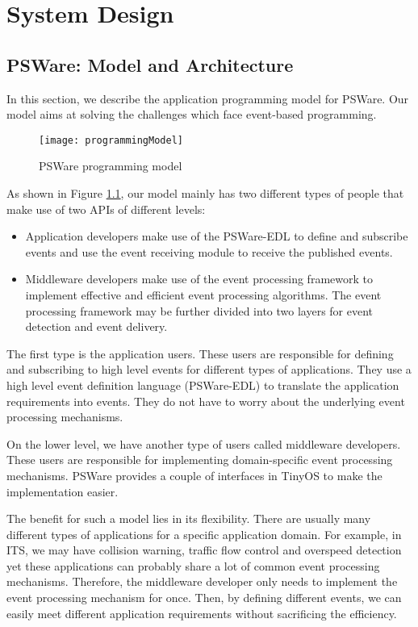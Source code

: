 \chapter{System Design}
\label{chapter:design}

\section{PSWare: Model and Architecture}
\label{sec:model}
In this section, we describe the application programming model for PSWare. Our model aims at solving the challenges which face event-based programming.

\begin{figure}
\centering
\texttt{[image: programmingModel]}
\caption{PSWare programming model}
\label{fig:programmingModel}
\end{figure}

As shown in Figure \ref{fig:programmingModel}, our model mainly has two different types of people that make use of two APIs of different levels:
\begin{itemize}
\item Application developers make use of the PSWare-EDL to define and subscribe events and use the event receiving module to receive the published events.
\item Middleware developers make use of the event processing framework to implement effective and efficient event processing algorithms. The event processing framework may be further divided into two layers for event detection and event delivery.
\end{itemize}

The first type is the application users. These users are responsible for defining and subscribing to high level events for different types of applications. They use a high level event definition language (PSWare-EDL) to translate the application requirements into events. They do not have to worry about the underlying event processing mechanisms.

On the lower level, we have another type of users called middleware developers. These users are responsible for implementing domain-specific event processing mechanisms. PSWare provides a couple of interfaces in TinyOS to make the implementation easier.

The benefit for such a model lies in its flexibility. There are usually many different types of applications for a specific application domain. For example, in ITS, we may have collision warning, traffic flow control and overspeed detection yet these applications can probably share a lot of common event processing mechanisms. Therefore, the middleware developer only needs to implement the event processing mechanism for once. Then, by defining different events, we can easily meet different application requirements without sacrificing the efficiency.

